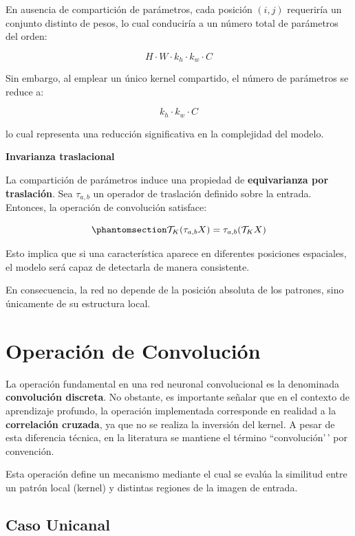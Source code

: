 \documentclass[
  spanish,
  us-letterpaper,
  DIV=11,
  numbers=noendperiod]{scrreprt}
\begin{document}
En ausencia de compartición de parámetros, cada posición \((i,j)\)
requeriría un conjunto distinto de pesos, lo cual conduciría a un número
total de parámetros del orden:

\[
H \cdot W \cdot k_h \cdot k_w \cdot C
\]

Sin embargo, al emplear un único kernel compartido, el número de
parámetros se reduce a:

\[
k_h \cdot k_w \cdot C
\]

lo cual representa una reducción significativa en la complejidad del
modelo.

\textbf{Invarianza traslacional}

La compartición de parámetros induce una propiedad de
\textbf{equivarianza por traslación}. Sea \(\tau_{a,b}\) un operador de
traslación definido sobre la entrada. Entonces, la operación de
convolución satisface:

\begin{equation}\phantomsection\label{eq-equivarianza}{
\mathcal{T}_K(\tau_{a,b} X) = \tau_{a,b} (\mathcal{T}_K X)
}\end{equation}

Esto implica que si una característica aparece en diferentes posiciones
espaciales, el modelo será capaz de detectarla de manera consistente.

En consecuencia, la red no depende de la posición absoluta de los
patrones, sino únicamente de su estructura local.

\section{Operación de Convolución}\label{operaciuxf3n-de-convoluciuxf3n}

La operación fundamental en una red neuronal convolucional es la
denominada \textbf{convolución discreta}. No obstante, es importante
señalar que en el contexto de aprendizaje profundo, la operación
implementada corresponde en realidad a la \textbf{correlación cruzada},
ya que no se realiza la inversión del kernel. A pesar de esta diferencia
técnica, en la literatura se mantiene el término ``convolución'\,' por
convención.

Esta operación define un mecanismo mediante el cual se evalúa la
similitud entre un patrón local (kernel) y distintas regiones de la
imagen de entrada.

\subsection{Caso Unicanal}\label{caso-unicanal}
\end{document}
